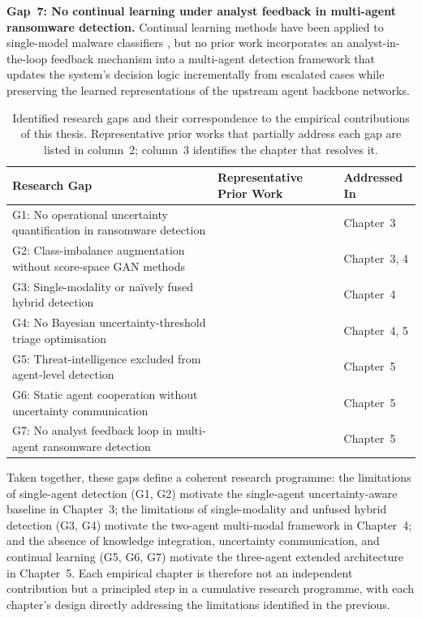 \textbf{Gap~7: No continual learning under analyst feedback in multi-agent ransomware detection.}
Continual learning methods have been applied to single-model malware classifiers
\cite{Ceschin2022ConceptDrift, Fernando2024FeSAD}, but no prior work incorporates an
analyst-in-the-loop feedback mechanism into a multi-agent detection framework that updates
the system's decision logic incrementally from escalated cases while preserving the learned
representations of the upstream agent backbone networks.

\begin{table}[ht]
\centering
\caption{Identified research gaps and their correspondence to the empirical contributions of
this thesis. Representative prior works that partially address each gap are listed in
column~2; column~3 identifies the chapter that resolves it.}
\label{tab:gaps}
\renewcommand{\arraystretch}{1.25}
\begin{tabular}{@{}p{5.5cm} p{4.5cm} l@{}}
\toprule
\textbf{Research Gap} & \textbf{Representative Prior Work} & \textbf{Addressed In} \\
\midrule
G1: No operational uncertainty quantification in ransomware detection
    & \cite{zahoora2022Deep, gal2016dropout}
    & Chapter~3 \\[4pt]
G2: Class-imbalance augmentation without score-space GAN methods
    & \cite{chawla2002smote, xu2019ctgan}
    & Chapter~3, 4 \\[4pt]
G3: Single-modality or na\"{i}vely fused hybrid detection
    & \cite{Ferdous2024Comp, yumlembam2024comprehensive}
    & Chapter~4 \\[4pt]
G4: No Bayesian uncertainty-threshold triage optimisation
    & \cite{Farzadpour2024Thresholding, optuna2019}
    & Chapter~4, 5 \\[4pt]
G5: Threat-intelligence excluded from agent-level detection
    & \cite{razaulla2023age, Alraizza2025StorageAP}
    & Chapter~5 \\[4pt]
G6: Static agent cooperation without uncertainty communication
    & \cite{MultiAgentAdaptiveDetection2023, gawlikowski2023Uncertainity}
    & Chapter~5 \\[4pt]
G7: No analyst feedback loop in multi-agent ransomware detection
    & \cite{Ceschin2022ConceptDrift, rolnick2019experience}
    & Chapter~5 \\
\bottomrule
\end{tabular}
\end{table}

Taken together, these gaps define a coherent research programme: the limitations of
single-agent detection (G1, G2) motivate the single-agent uncertainty-aware baseline in
Chapter~3; the limitations of single-modality and unfused hybrid detection (G3, G4) motivate
the two-agent multi-modal framework in Chapter~4; and the absence of knowledge integration,
uncertainty communication, and continual learning (G5, G6, G7) motivate the three-agent
extended architecture in Chapter~5.
Each empirical chapter is therefore not an independent contribution but a principled step in
a cumulative research programme, with each chapter's design directly addressing the
limitations identified in the previous.

